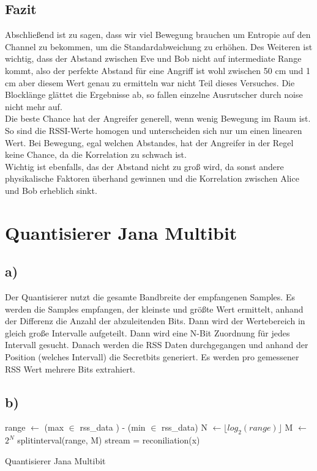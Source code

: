 \documentclass[12pt,a4paper]{article}
\begin{document}
\subsection*{Fazit}
Abschließend ist zu sagen, dass wir viel Bewegung brauchen um Entropie auf den Channel zu bekommen, um die Standardabweichung zu erhöhen. Des Weiteren ist wichtig, dass der Abstand zwischen Eve und Bob nicht auf intermediate Range kommt, also der perfekte Abstand für eine Angriff ist wohl zwischen 50 cm und 1 cm aber diesem Wert genau zu ermitteln war nicht Teil dieses Versuches. Die Blocklänge glättet die Ergebnisse ab, so fallen einzelne Ausrutscher durch noise nicht mehr auf. \\
Die beste Chance hat der Angreifer generell, wenn wenig Bewegung im Raum ist. So sind die RSSI-Werte homogen und unterscheiden sich nur um einen linearen Wert. Bei Bewegung, egal welchen Abstandes, hat der Angreifer in der Regel keine Chance, da die Korrelation zu schwach ist.\\
Wichtig ist ebenfalls, das der Abstand nicht zu groß wird, da sonst andere physikalische Faktoren überhand gewinnen und die Korrelation zwischen Alice und Bob erheblich sinkt.
\section{Quantisierer Jana Multibit}
\subsection*{a)}
Der Quantisierer nutzt die gesamte Bandbreite der empfangenen Samples. Es werden die Samples empfangen, der kleinste und größte Wert ermittelt, anhand der Differenz die Anzahl der abzuleitenden Bits. Dann wird der Wertebereich in gleich große Intervalle aufgeteilt. Dann wird eine N-Bit Zuordnung für jedes Intervall gesucht. Danach werden die RSS Daten durchgegangen und anhand der Position (welches Intervall) die Secretbits generiert. Es werden pro gemessener RSS Wert mehrere Bits extrahiert.
\subsection*{b)}
\begin{algorithm}[H]
\DontPrintSemicolon
\SetAlgoLined
{}
range $\gets$ (max $\in$ rss\_data ) - (min $\in$ rss\_data) \;
N $\gets$$\lfloor log_2(range) \rfloor$\;
M $\gets$ $2^N$ \;
splitinterval(range, M)\;
stream = reconiliation(x)
\caption{Quantisierer Jana Multibit}
\end{algorithm}
\end{document}
